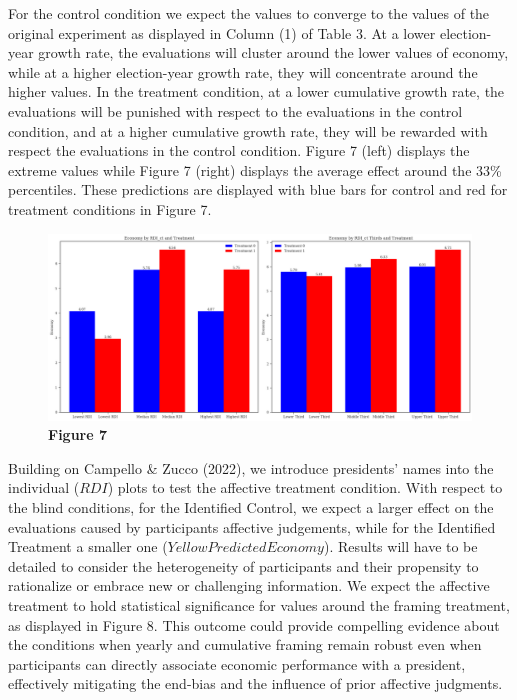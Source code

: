 \documentclass[
]{article}
\begin{document}


For the control condition we expect the values to converge to the values
of the original experiment as displayed in Column (1) of Table 3. At a
lower election-year growth rate, the evaluations will cluster around the
lower values of economy, while at a higher election-year growth rate,
they will concentrate around the higher values. In the treatment
condition, at a lower cumulative growth rate, the evaluations will be
punished with respect to the evaluations in the control condition, and
at a higher cumulative growth rate, they will be rewarded with respect
the evaluations in the control condition. Figure 7 (left) displays the
extreme values while Figure 7 (right) displays the average effect around
the 33\% percentiles. These predictions are displayed with blue bars for
control and red for treatment conditions in Figure 7.

\begin{figure}
\centering
\includegraphics{treat_lowthird.png}
\caption{\textbf{Figure 7}}
\end{figure}

Building on Campello \& Zucco (2022), we introduce presidents' names
into the individual (\(RDI\)) plots to test the affective treatment
condition. With respect to the blind conditions, for the Identified
Control, we expect a larger effect on the evaluations caused by
participants affective judgements, while for the Identified Treatment a
smaller one (\(Yellow Predicted Economy\)). Results will have to be
detailed to consider the heterogeneity of participants and their
propensity to rationalize or embrace new or challenging information. We
expect the affective treatment to hold statistical significance for
values around the framing treatment, as displayed in Figure 8. This
outcome could provide compelling evidence about the conditions when
yearly and cumulative framing remain robust even when participants can
directly associate economic performance with a president, effectively
mitigating the end-bias and the influence of prior affective judgments.
\end{document}
